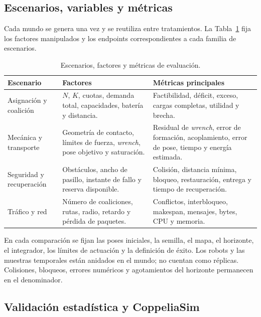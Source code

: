 \subsection{Escenarios, variables y métricas}
\label{sec:method_scenarios_metrics}

Cada mundo se genera una vez y se reutiliza entre tratamientos. La
Tabla~\ref{tab:method_scenarios_metrics} fija los factores manipulados y los
endpoints correspondientes a cada familia de escenarios.

\begin{table}[H]
    \centering
    \caption{Escenarios, factores y métricas de evaluación.}
    \label{tab:method_scenarios_metrics}
    \footnotesize
    \renewcommand{\arraystretch}{1.08}
    \begin{tabularx}{\textwidth}{@{}p{2.5cm}p{4.6cm}X@{}}
        \toprule
        \textbf{Escenario} & \textbf{Factores} & \textbf{Métricas principales} \\
        \midrule
        Asignación y coalición &
        \(N\), \(K\), cuotas, demanda total, capacidades, batería y distancia. &
        Factibilidad, déficit, exceso, cargas completas, utilidad y brecha. \\
        Mecánica y transporte &
        Geometría de contacto, límites de fuerza, \emph{wrench}, pose objetivo y saturación. &
        Residual de \emph{wrench}, error de formación, acoplamiento, error de pose, tiempo y energía estimada. \\
        Seguridad y recuperación &
        Obstáculos, ancho de pasillo, instante de fallo y reserva disponible. &
        Colisión, distancia mínima, bloqueo, restauración, entrega y tiempo de recuperación. \\
        Tráfico y red &
        Número de coaliciones, rutas, radio, retardo y pérdida de paquetes. &
        Conflictos, interbloqueo, makespan, mensajes, bytes, CPU y memoria. \\
        \bottomrule
    \end{tabularx}
    \viuownsource
\end{table}

En cada comparación se fijan las poses iniciales, la semilla, el mapa, el
horizonte, el integrador, los límites de actuación y la definición de éxito. Los
robots y las muestras temporales están anidados en el mundo; no cuentan como
réplicas. Colisiones, bloqueos, errores numéricos y agotamientos del horizonte
permanecen en el denominador.

\subsection{Validación estadística y CoppeliaSim}
\label{sec:method_statistics_coppelia}

